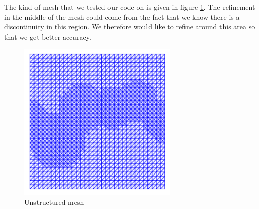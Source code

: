 \documentclass[11pt]{article}
\numberwithin{equation}{section}    %
\begin{document}
The kind of mesh that we tested our code on is given in figure \ref{fig:mesh}. The refinement in the middle of the mesh could come from the fact that we know there is a discontinuity in this region. We therefore would like to refine around this area so that we get better accuracy.
\begin{figure}[h!]
\begin{center}
\includegraphics[width=3in]{../figures/dolfin_plot_0.png}
\caption{Unstructured mesh}
\label{fig:mesh}
\end{center}
\end{figure}
\end{document}
